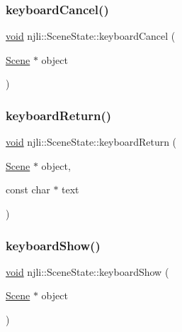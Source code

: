 \subsubsection{\texorpdfstring{keyboard\+Cancel()}{keyboardCancel()}}
{\footnotesize\ttfamily \mbox{\hyperlink{_thread_8h_af1e856da2e658414cb2456cb6f7ebc66}{void}} njli\+::\+Scene\+State\+::keyboard\+Cancel (\begin{DoxyParamCaption}\item[{\mbox{\hyperlink{classnjli_1_1_scene}{Scene}} $\ast$}]{object }\end{DoxyParamCaption})}

\mbox{\label{classnjli_1_1_scene_state_af2aa710b56f4cf5d513e71c1490d5f26}} 
\subsubsection{\texorpdfstring{keyboard\+Return()}{keyboardReturn()}}
{\footnotesize\ttfamily \mbox{\hyperlink{_thread_8h_af1e856da2e658414cb2456cb6f7ebc66}{void}} njli\+::\+Scene\+State\+::keyboard\+Return (\begin{DoxyParamCaption}\item[{\mbox{\hyperlink{classnjli_1_1_scene}{Scene}} $\ast$}]{object,  }\item[{const char $\ast$}]{text }\end{DoxyParamCaption})}

\mbox{\label{classnjli_1_1_scene_state_adda084dbfb2c043d462fa37269f1deb5}} 
\subsubsection{\texorpdfstring{keyboard\+Show()}{keyboardShow()}}
{\footnotesize\ttfamily \mbox{\hyperlink{_thread_8h_af1e856da2e658414cb2456cb6f7ebc66}{void}} njli\+::\+Scene\+State\+::keyboard\+Show (\begin{DoxyParamCaption}\item[{\mbox{\hyperlink{classnjli_1_1_scene}{Scene}} $\ast$}]{object }\end{DoxyParamCaption})}

